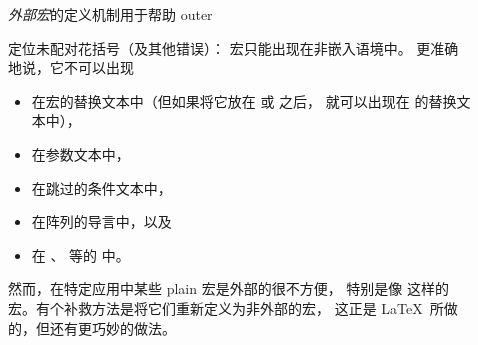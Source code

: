 \documentclass[letterpaper]{book}
\begin{document}
\begin{description}
\item []
\emph{外部宏}的定义机制用于帮助%
\cstoidx outer\par
定位未配对花括号（及其他错误）： 宏只能出现在非嵌入语境中。
更准确地说，它不可以出现
\begin{itemize}
\item 在宏的替换文本中（但如果将它放在  或  之后，
就可以出现在  的替换文本中），
\item 在参数文本中，
\item 在跳过的条件文本中，
\item 在阵列的导言中，以及
\item 在 、 等的  中。
\end{itemize}
然而，在特定应用中某些 plain 宏是外部的很不方便，
特别是像  这样的宏。有个补救方法是将它们重新定义为非外部的宏，
这正是 \LaTeX\ 所做的，但还有更巧妙的做法。



\end{description}
\end{document}
